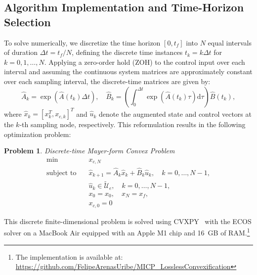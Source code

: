 \documentclass[conf]{new-aiaa}
\newtheorem{problem}{Problem}
\begin{document}

\subsection{Algorithm Implementation and Time-Horizon Selection}

To solve  numerically, we discretize the time horizon $[0,t_f]$ into $N$ equal intervals of duration $\Delta t = t_f / N$, defining the discrete time instances $t_k = k \Delta t$ for $k = 0, 1, \dots, N$. Applying a zero-order hold (ZOH) to the control input over each interval and assuming the continuous system matrices are approximately constant over each sampling interval, the discrete-time matrices are given by:
%
\begin{equation*}
    \hat{A}_k = \exp\left(\hat{A}(t_k)\Delta t\right), \quad \hat{B}_k = \left(\int_{0}^{\Delta t} \exp\left(\hat{A}(t_k)\tau\right)\mathrm{d}\tau\right)\hat{B}(t_k),
\end{equation*}
%
where $\hat{x}_k = [x_k^T, x_{c,k}]^T$ and $\hat{u}_k$ denote the augmented state and control vectors at the $k$-th sampling node, respectively. This reformulation results in the following optimization problem:
%
\begin{problem}\rm{Discrete-time Mayer-form Convex Problem}\label{prob:CP_Mayer_discrete}
    \begin{subequations}
        \begin{align}
            \min \quad & x_{c,N} \label{eq:Discrete_Objective}\\
            \text{subject to} \quad 
            & \hat{x}_{k+1} = \hat{A}_k \hat{x}_k + \hat{B}_k \hat{u}_k, \quad k = 0, \dots, N-1, \label{eq:Prob_Discrete_Dynamics}\\
            & \hat{u}_k \in \tilde{\mathcal{U}}_e, \quad k = 0, \dots, N-1, \label{eq:Prob_Discrete_Control}\\
            & x_0 = x_0, \quad x_N = x_f, \label{eq:Prob_Discrete_BC}\\
            & x_{c,0} = 0 \label{eq:Prob_Discrete_Cost_Init}
        \end{align}
    \end{subequations}
\end{problem}

This discrete finite-dimensional problem is solved using CVXPY~\cite{diamond_cvxpy_2016} with the ECOS solver on a MacBook Air equipped with an Apple M1 chip and 16~GB of RAM.\footnote{The implementation is available at: \url{https://github.com/FelipeArenasUribe/MICP_LosslessConvexification}}
\end{document}

